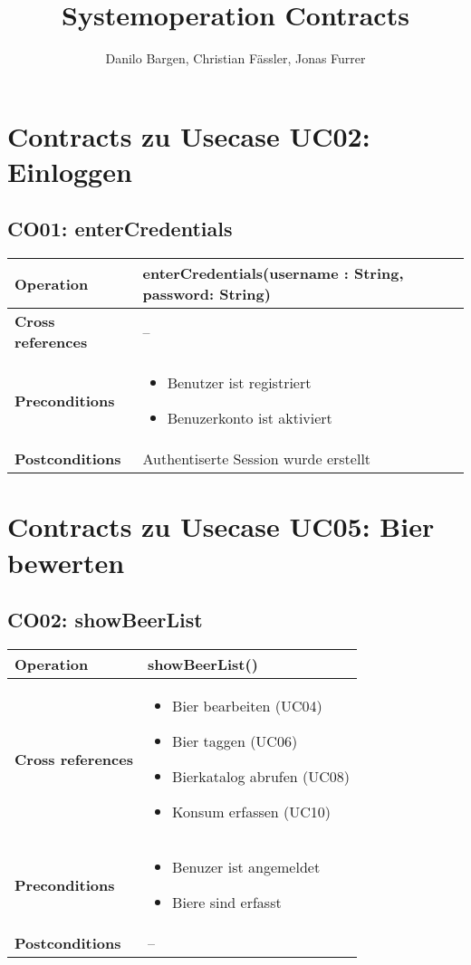 \documentclass[10pt,a4paper]{scrartcl}
\author{Danilo Bargen, Christian Fässler, Jonas Furrer}
\title{Systemoperation Contracts}
\begin{document}
\begin{titlepage}
	\maketitle
	\vspace{120mm}
	\thispagestyle{empty} %
\end{titlepage}

\section{Contracts zu Usecase UC02: Einloggen}
\subsection{CO01: enterCredentials}
\begin{tabular}{|l|p{\textwidth}|}
\hline
 \textbf{Operation} & enterCredentials(username : String, password: String) \\ 
\hline
\textbf{Cross references} & -- \\ 
\hline 
\textbf{Preconditions} & \begin{itemize} 
							\item Benutzer ist registriert
							\item Benuzerkonto ist aktiviert 
						  \end{itemize}\\
\hline 
\textbf{Postconditions} & Authentiserte Session wurde erstellt \\
\hline
\end{tabular}

\section{Contracts zu Usecase UC05: Bier bewerten}
\subsection{CO02: showBeerList}
\begin{tabular}{|l|p{\textwidth}|}
\hline
 \textbf{Operation} & showBeerList() \\ 
\hline
\textbf{Cross references} & \begin{itemize}
								\item Bier bearbeiten (UC04)
								\item Bier taggen (UC06)
								\item Bierkatalog abrufen (UC08)
								\item Konsum erfassen (UC10)
							\end{itemize} \\ 
\hline 
\textbf{Preconditions} & \begin{itemize}
							\item Benuzer ist angemeldet
							\item Biere sind erfasst 
						 \end{itemize}\\
\hline 
\textbf{Postconditions} & -- \\
\hline
\end{tabular}
\end{document}
